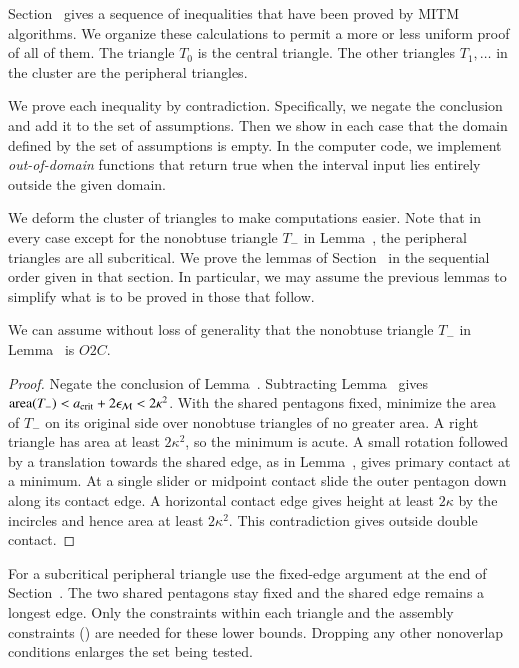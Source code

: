Section~ gives a sequence of inequalities that have been
proved by MITM algorithms.  We organize these calculations to permit a
more or less uniform proof of all of them.  The triangle $T_0$ is  the
central triangle.  The other triangles $T_1,\ldots$ in the cluster are the
peripheral triangles.

We prove each inequality by contradiction. Specifically, we negate the
conclusion and add it to the set of assumptions.  Then we show in each
case that the domain defined by the set of assumptions is empty. In
the computer code, we implement {\it out-of-domain} functions that
return true when the interval input lies entirely outside the given
domain.

We deform the cluster of triangles to make computations easier.  Note
that in every case except for the nonobtuse triangle $T_-$ in
Lemma~, the peripheral triangles are all
subcritical.  We prove the lemmas of Section~ in the
sequential order given in that section.  In particular, we may
assume the previous lemmas to simplify what is to be proved in those
that follow.

\begin{lemma}
  We can assume without loss of generality that the nonobtuse triangle $T_-$ in
  Lemma~ is $O2C$.
\end{lemma}

\begin{proof}
Negate the conclusion of Lemma~. Subtracting
Lemma~ gives ${\operatorname{area}}(T_-)<a_\text{crit}+2\epsilon_{\mathcal M}<2\kappa^2$.
With the shared pentagons fixed, minimize the area of $T_-$ on its
original side over nonobtuse triangles of no greater area. A right
triangle has area at least $2\kappa^2$, so the minimum is acute.
A small rotation followed by a translation towards the shared edge,
as in Lemma~, gives primary contact at a minimum.
At a single slider or midpoint contact slide the outer pentagon down
along its contact edge. A horizontal contact edge gives height at
least $2\kappa$ by the incircles and hence area at least $2\kappa^2$.
This contradiction gives outside double contact.
\end{proof}

For a subcritical peripheral triangle use the fixed-edge argument
at the end of Section~. The two shared pentagons stay
fixed and the shared edge remains a longest edge. Only the constraints
within each triangle and the assembly constraints
() are needed for these lower bounds. Dropping
any other nonoverlap conditions enlarges the set being tested.

